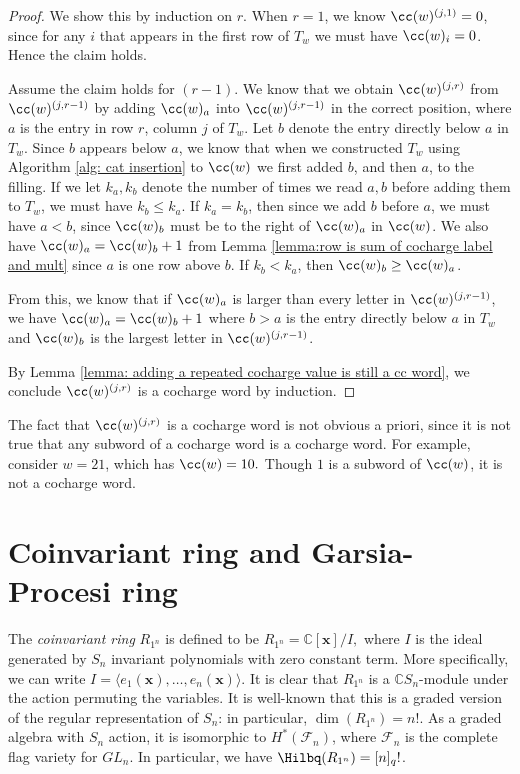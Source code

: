 \begin{proof}
    We show this by induction on $r$. When $r=1$, we know $\cc(w)^{(j,1)} = 0$, since for any $i$ that appears in the first row of $T_w$ we must have $\cc(w)_i = 0$. Hence the claim holds.

    Assume the claim holds for $(r-1)$. We know that we obtain $\cc(w)^{(j,r)}$ from $\cc(w)^{(j,r-1)}$ by adding $\cc(w)_a$ into $\cc(w)^{(j,r-1)}$ in the correct position, where $a$ is the entry in row $r$, column $j$ of $T_w$.
    Let $b$ denote the entry directly below $a$ in $T_w$.
    Since $b$ appears below $a$, we know that when we constructed $T_w$ using Algorithm \ref{alg: cat insertion} to $\cc(w)$ we first added $b$, and then $a$, to the filling.
    If we let $k_a, k_b$ denote the number of times we read $a,b$ before adding them to $T_w$, we must have $k_b \leq  k_a$.
    If $k_a = k_b$, then since we add $b$ before $a$, we must have $a<b$, since $\cc(w)_b$ must be to the right of $\cc(w)_a$ in $\cc(w)$. We also have $\cc(w)_{a} = \cc(w)_{b} + 1$ from Lemma \ref{lemma:row is sum of cocharge label and mult} since $a$ is one row above $b$.  If $k_b < k_a$, then $\cc(w)_{b} \geq  \cc(w)_{a}$. 
    
    From this, we know that if $\cc(w)_a$ is larger than every letter in $\cc(w)^{(j,r-1)}$, we have $\cc(w)_a = \cc(w)_b+1$ where $b>a$ is the entry directly below $a$ in $T_w$ and $\cc(w)_b$ is the largest letter in $\cc(w)^{(j,r-1)}$.

     By Lemma \ref{lemma: adding a repeated cocharge value is still a cc word}, we conclude $\cc(w)^{(j,r)}$ is a cocharge word by induction.
\end{proof}

\begin{rema}
    The fact that $\cc(w)^{(j,r)}$ is a cocharge word is not obvious a priori, since it is not true that any subword of a cocharge word is a cocharge word. For example, consider $w = 21 $, which has $\cc(w) =10.$ Though $1$ is a subword of $\cc(w)$, it is not a cocharge word.
\end{rema}

\section{Coinvariant ring and Garsia-Procesi ring}\label{section: coinvariant ring and garsia procesi}

The \textit{coinvariant ring} $R_{1^n}$ is defined to be  $R_{1^n}= \mathbb{C}[\mathbf{x}]/ I,$ where $I$ is the ideal generated by $S_n$ invariant polynomials with zero constant term. More specifically, we can write $I = \langle e_1(\mathbf{x}),\dots, e_n(\mathbf{x})\rangle$.
It is clear that $R_{1^n}$ is a $\mathbb{C}S_n$-module under the action permuting the variables. 
It is well-known that this is a graded version of the regular representation of $S_n$: in particular, $\dim(R_{1^n}) = n!$. As a graded algebra with $S_n$ action, it is isomorphic to $H^{\ast}(\mathcal{F}_n)$, where $\mathcal{F}_n$ is the complete flag variety for $GL_n$. In particular, we have $\Hilbq(R_{1^n}) =[n]_q!$.

